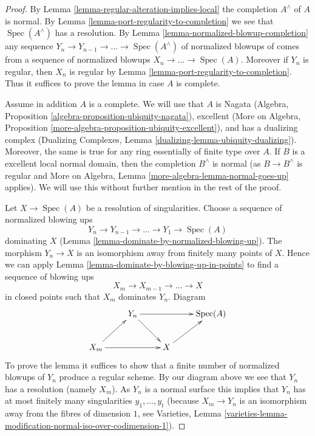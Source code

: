 \documentclass{stacks-project}
\theoremstyle{plain}
\theoremstyle{definition}
\theoremstyle{remark}
\numberwithin{equation}{subsection}
\def\Spec{\mathop{\mathrm{Spec}}}
\begin{document}
\begin{proof}
By Lemma \ref{lemma-regular-alteration-implies-local}
the completion $A^\wedge$ of $A$ is normal.
By Lemma \ref{lemma-port-regularity-to-completion} we see
that $\Spec(A^\wedge)$ has a resolution.
By Lemma \ref{lemma-normalized-blowup-completion}
any sequence $Y_n \to Y_{n - 1} \to \ldots \to \Spec(A^\wedge)$
of normalized blowups of comes from a sequence of normalized
blowups $X_n \to \ldots \to \Spec(A)$. Moreover if $Y_n$ is
regular, then $X_n$ is regular by
Lemma \ref{lemma-port-regularity-to-completion}.
Thus it suffices to prove the lemma in case $A$ is complete.

\medskip\noindent
Assume in addition $A$ is a complete. We will use that $A$ is Nagata
(Algebra, Proposition \ref{algebra-proposition-ubiquity-nagata}),
excellent (More on Algebra, Proposition
\ref{more-algebra-proposition-ubiquity-excellent}),
and has a dualizing complex
(Dualizing Complexes, Lemma \ref{dualizing-lemma-ubiquity-dualizing}).
Moreover, the same is true for any ring essentially of finite type over $A$.
If $B$ is a excellent local normal domain, then the completion
$B^\wedge$ is normal (as $B \to B^\wedge$ is regular and
More on Algebra, Lemma \ref{more-algebra-lemma-normal-goes-up} applies).
We will use this without further mention in the rest of the proof.

\medskip\noindent
Let $X \to \Spec(A)$ be a resolution of singularities.
Choose a sequence of normalized blowing ups
$$
Y_n \to Y_{n - 1} \to \ldots \to Y_1 \to \Spec(A)
$$
dominating $X$ (Lemma \ref{lemma-dominate-by-normalized-blowing-up}).
The morphism $Y_n \to X$ is an isomorphism away from
finitely many points of $X$.
Hence we can apply Lemma \ref{lemma-dominate-by-blowing-up-in-points}
to find a sequence of blowing ups
$$
X_m \to X_{m - 1} \to \ldots \to X
$$
in closed points such that $X_m$ dominates $Y_n$. Diagram
$$
\xymatrix{
& Y_n \ar[rd] \ar[rr] & & \Spec(A) \\
X_m \ar[rr] \ar[ru] & & X \ar[ru]
}
$$
To prove the lemma it suffices to show that a finite number of normalized
blowups of $Y_n$ produce a regular scheme. By our diagram above we see that
$Y_n$ has a resolution (namely $X_m$). As $Y_n$ is a normal surface
this implies that $Y_n$ has at most finitely many singularities
$y_1, \ldots, y_t$ (because $X_m \to Y_n$ is an isomorphism away from
the fibres of dimension $1$, see Varieties, Lemma
\ref{varieties-lemma-modification-normal-iso-over-codimension-1}).


\end{proof}
\end{document}
